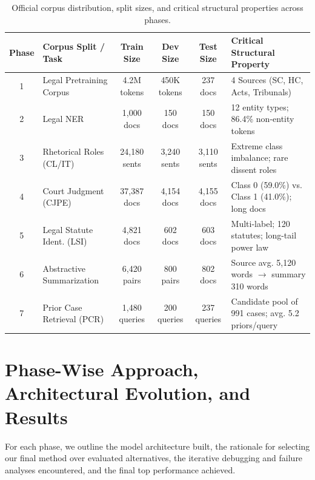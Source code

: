 \documentclass[11pt, oneside]{article}
\begin{document}
\begin{table}[H]
\centering
\small
\caption{Official corpus distribution, split sizes, and critical structural properties across phases.}
\label{tab:corpus_stats}
\begin{tabularx}{\textwidth}{clcccX}
\toprule
\textbf{Phase} & \textbf{Corpus Split / Task} & \textbf{Train Size} & \textbf{Dev Size} & \textbf{Test Size} & \textbf{Critical Structural Property} \\
\midrule
1 & Legal Pretraining Corpus & 4.2M tokens & 450K tokens & 237 docs & 4 Sources (SC, HC, Acts, Tribunals) \\
2 & Legal NER & 1,000 docs & 150 docs & 150 docs & 12 entity types; 86.4\% non-entity tokens \\
3 & Rhetorical Roles (CL/IT) & 24,180 sents & 3,240 sents & 3,110 sents & Extreme class imbalance; rare dissent roles \\
4 & Court Judgment (CJPE) & 37,387 docs & 4,154 docs & 4,155 docs & Class 0 (59.0\%) vs. Class 1 (41.0\%); long docs \\
5 & Legal Statute Ident. (LSI) & 4,821 docs & 602 docs & 603 docs & Multi-label; 120 statutes; long-tail power law \\
6 & Abstractive Summarization & 6,420 pairs & 800 pairs & 802 docs & Source avg. 5,120 words $\to$ summary 310 words \\
7 & Prior Case Retrieval (PCR) & 1,480 queries & 200 queries & 237 queries & Candidate pool of 991 cases; avg. 5.2 priors/query \\
\bottomrule
\end{tabularx}
\end{table}

\section{Phase-Wise Approach, Architectural Evolution, and Results}
\noindent
For each phase, we outline the model architecture built, the rationale for selecting our final method over evaluated alternatives, the iterative debugging and failure analyses encountered, and the final top performance achieved.

\end{document}
